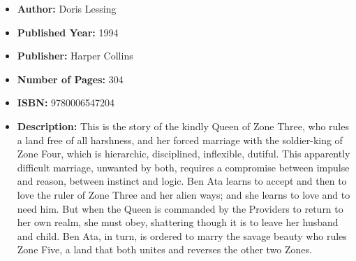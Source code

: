 \documentclass{tufte-handout}
\begin{document}
\begin{itemize}
    \item[] \textbf{Author:} Doris Lessing
    \item[] \textbf{Published Year:} 1994
    \item[] \textbf{Publisher:} Harper Collins
    \item[] \textbf{Number of Pages:} 304      
    \item[] \textbf{ISBN:} 9780006547204
    \item[] \textbf{Description:} This is the story of the kindly Queen of Zone Three, who rules a land free of all harshness, and her forced marriage with the soldier-king of Zone Four, which is hierarchic, disciplined, inflexible, dutiful. This apparently difficult marriage, unwanted by both, requires a compromise between impulse and reason, between instinct and logic. Ben Ata learns to accept and then to love the ruler of Zone Three and her alien ways; and she learns to love and to need him. But when the Queen is commanded by the Providers to return to her own realm, she must obey, shattering though it is to leave her husband and child. Ben Ata, in turn, is ordered to marry the savage beauty who rules Zone Five, a land that both unites and reverses the other two Zones.
\end{itemize}
\end{document}
